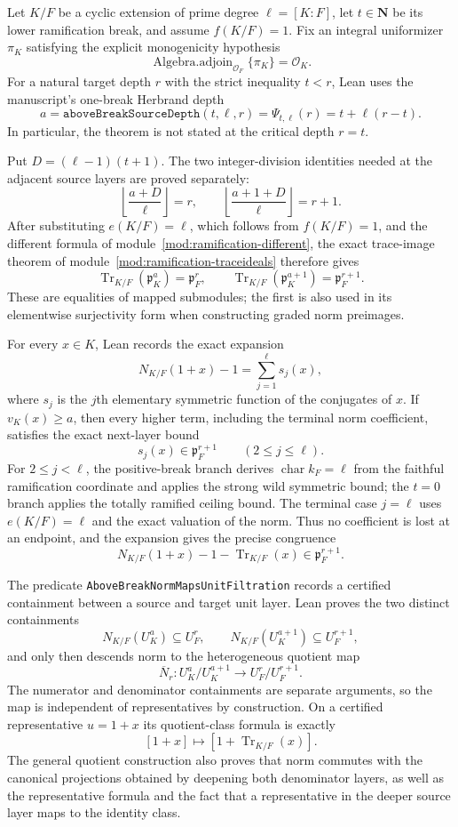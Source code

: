 \begin{theorem}
\label{mod:ramification-normabovebreak}
Let $K/F$ be a cyclic extension of prime degree
$\ell=[K:F]$, let $t\in\mathbf N$ be its lower ramification break, and
assume $f(K/F)=1$.  Fix an integral uniformizer $\pi_K$ satisfying the
explicit monogenicity hypothesis
\[
 \operatorname{Algebra.adjoin}_{\mathcal O_F}\{\pi_K\}=\mathcal O_K.
\]
For a natural target depth $r$ with the strict inequality $t<r$, Lean uses
the manuscript's one-break Herbrand depth
\[
 a=\texttt{aboveBreakSourceDepth}(t,\ell,r)
   =\Psi_{t,\ell}(r)=t+\ell(r-t).
\]
In particular, the theorem is not stated at the critical depth $r=t$.

Put $D=(\ell-1)(t+1)$.  The two integer-division identities needed at the
adjacent source layers are proved separately:
\[
 \left\lfloor\frac{a+D}{\ell}\right\rfloor=r,
 \qquad
 \left\lfloor\frac{a+1+D}{\ell}\right\rfloor=r+1.
\]
After substituting $e(K/F)=\ell$, which follows from $f(K/F)=1$, and the
different formula of module~\ref{mod:ramification-different}, the exact
trace-image theorem of module~\ref{mod:ramification-traceideals} therefore
gives
\[
 \operatorname{Tr}_{K/F}(\mathfrak p_K^a)=\mathfrak p_F^r,
 \qquad
 \operatorname{Tr}_{K/F}(\mathfrak p_K^{a+1})=\mathfrak p_F^{r+1}.
\]
These are equalities of mapped submodules; the first is also used in its
elementwise surjectivity form when constructing graded norm preimages.

For every $x\in K$, Lean records the exact expansion
\[
 N_{K/F}(1+x)-1=\sum_{j=1}^{\ell}s_j(x),
\]
where $s_j$ is the $j$th elementary symmetric function of the conjugates
of $x$.  If $v_K(x)\ge a$, then every higher term, including the terminal
norm coefficient, satisfies the exact next-layer bound
\[
 s_j(x)\in\mathfrak p_F^{r+1}
 \qquad(2\le j\le\ell).
\]
For $2\le j<\ell$, the positive-break branch derives
$\operatorname{char}k_F=\ell$ from the faithful ramification coordinate
and applies the strong wild symmetric bound; the $t=0$ branch applies the
totally ramified ceiling bound.  The terminal case $j=\ell$ uses
$e(K/F)=\ell$ and the exact valuation of the norm.  Thus no coefficient is
lost at an endpoint, and the expansion gives the precise congruence
\[
 N_{K/F}(1+x)-1-\operatorname{Tr}_{K/F}(x)
   \in\mathfrak p_F^{r+1}.
\]

The predicate \texttt{AboveBreakNormMapsUnitFiltration} records a certified
containment between a source and target unit layer.  Lean proves the two
distinct containments
\[
 N_{K/F}(U_K^a)\subseteq U_F^r,
 \qquad
 N_{K/F}(U_K^{a+1})\subseteq U_F^{r+1},
\]
and only then descends norm to the heterogeneous quotient map
\[
 \overline N_r:U_K^a/U_K^{a+1}\longrightarrow U_F^r/U_F^{r+1}.
\]
The numerator and denominator containments are separate arguments, so the
map is independent of representatives by construction.  On a certified
representative $u=1+x$ its quotient-class formula is exactly
\[
 [1+x]\longmapsto[1+\operatorname{Tr}_{K/F}(x)].
\]
The general quotient construction also proves that norm commutes with the
canonical projections obtained by deepening both denominator layers, as
well as the representative formula and the fact that a representative in
the deeper source layer maps to the identity class.


\end{theorem}
